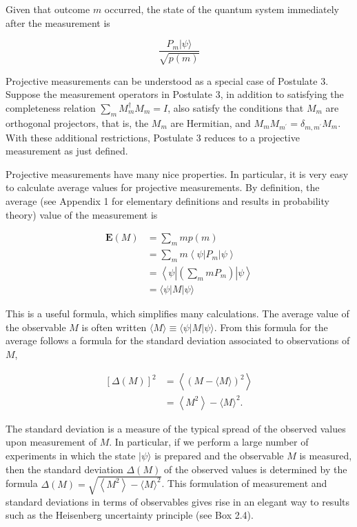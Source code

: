 \documentclass[10pt]{article}
\begin{document}
Given that outcome $m$ occurred, the state of the quantum system immediately after the measurement is


\begin{equation*}
\frac{P_{m}|\psi\rangle}{\sqrt{p(m)}} \tag{2.104}
\end{equation*}


Projective measurements can be understood as a special case of Postulate 3. Suppose the measurement operators in Postulate 3, in addition to satisfying the completeness relation $\sum_{m} M_{m}^{\dagger} M_{m}=I$, also satisfy the conditions that $M_{m}$ are orthogonal projectors, that is, the $M_{m}$ are Hermitian, and $M_{m} M_{m^{\prime}}=\delta_{m, m^{\prime}} M_{m}$. With these additional restrictions, Postulate 3 reduces to a projective measurement as just defined.

Projective measurements have many nice properties. In particular, it is very easy to calculate average values for projective measurements. By definition, the average (see Appendix 1 for elementary definitions and results in probability theory) value of the measurement is


\begin{align*}
\mathbf{E}(M) & =\sum_{m} m p(m)  \tag{2.110}\\
& =\sum_{m} m\left\langle\psi\left|P_{m}\right| \psi\right\rangle  \tag{2.111}\\
& =\left\langle\psi\left|\left(\sum_{m} m P_{m}\right)\right| \psi\right\rangle  \tag{2.112}\\
& =\langle\psi|M| \psi\rangle \tag{2.113}
\end{align*}


This is a useful formula, which simplifies many calculations. The average value of the observable $M$ is often written $\langle M\rangle \equiv\langle\psi|M| \psi\rangle$. From this formula for the average follows a formula for the standard deviation associated to observations of $M$,


\begin{align*}
{[\Delta(M)]^{2} } & =\left\langle(M-\langle M\rangle)^{2}\right\rangle  \tag{2.114}\\
& =\left\langle M^{2}\right\rangle-\langle M\rangle^{2} . \tag{2.115}
\end{align*}


The standard deviation is a measure of the typical spread of the observed values upon measurement of $M$. In particular, if we perform a large number of experiments in which the state $|\psi\rangle$ is prepared and the observable $M$ is measured, then the standard deviation $\Delta(M)$ of the observed values is determined by the formula $\Delta(M)=\sqrt{\left\langle M^{2}\right\rangle-\langle M\rangle^{2}}$. This formulation of measurement and standard deviations in terms of observables gives rise in an elegant way to results such as the Heisenberg uncertainty principle (see Box 2.4).
\end{document}
